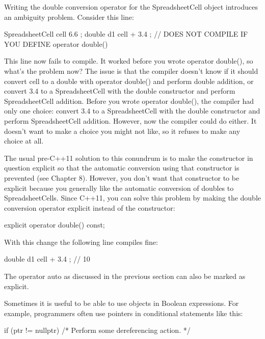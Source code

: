Writing the double conversion operator for the SpreadsheetCell object introduces an ambiguity problem. Consider this line:

\begin{cpp}
SpreadsheetCell cell { 6.6 };
double d1 { cell + 3.4 }; // DOES NOT COMPILE IF YOU DEFINE operator double()
\end{cpp}

This line now fails to compile. It worked before you wrote operator double(), so what’s the problem now? The issue is that the compiler doesn’t know if it should convert cell to a double with operator double() and perform double addition, or convert 3.4 to a SpreadsheetCell with the double constructor and perform SpreadsheetCell addition. Before you wrote operator double(), the compiler had only one choice: convert 3.4 to a SpreadsheetCell with the double constructor and perform SpreadsheetCell addition. However, now the compiler could do either. It doesn’t want to make a choice you might not like, so it refuses to make any choice at all.

The usual pre-C++11 solution to this conundrum is to make the constructor in question explicit so that the automatic conversion using that constructor is prevented (see Chapter 8). However, you don’t want that constructor to be explicit because you generally like the automatic conversion of doubles to SpreadsheetCells. Since C++11, you can solve this problem by making the double conversion operator explicit instead of the constructor:

\begin{cpp}
explicit operator double() const;
\end{cpp}

With this change the following line compiles fine:

\begin{cpp}
double d1 { cell + 3.4 }; // 10
\end{cpp}

The operator auto as discussed in the previous section can also be marked as explicit.


Sometimes it is useful to be able to use objects in Boolean expressions. For example, programmers often use pointers in conditional statements like this:

\begin{cpp}
if (ptr != nullptr) { /* Perform some dereferencing action. */ }
\end{cpp}

